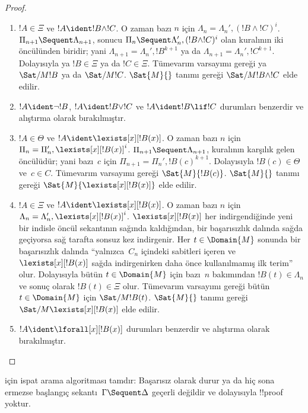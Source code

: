 \begin{proof}
\begin{enumerate}
  \item $!A \in \Xi$ ve $!A \ident !B \land !C$. O zaman bazı $n$ için
  $\Lambda_n = \Lambda_n', (!B \land !C)^i$. $\Pi_{n+1} \Sequent
  \Lambda_{n+1}$, sonucu $\Pi_n \Sequent \Lambda'_n, (!B \land !C)^i$ olan
  \RightR{\land} kuralının iki öncülünden biridir; yani $\Lambda_{n+1} =
  \Lambda_n', !B^{k+1}$ ya da $\Lambda_{n+1} = \Lambda_n', !C^{k+1}$.
  Dolayısıyla ya $!B \in \Xi$ ya da $!C \in \Xi$. Tümevarım varsayımı
  gereği ya $\Sat/{M}{!B}$ ya da $\Sat/{M}{!C}$. $\Sat{M}{}$ tanımı gereği
  $\Sat/{M}{!B \land !C}$ elde edilir.

  \item $!A \ident \lnot !B$, $!A \ident !B \lor !C$ ve $!A \ident !B
  \lif !C$ durumları benzerdir ve alıştırma olarak bırakılmıştır.

  \item $!A \in \Theta$ ve $!A \ident \lexists[x][!B(x)]$. O zaman bazı
  $n$ için $\Pi_n = \Pi_n', \lexists[x][!B(x)]^i$. $\Pi_{n+1} \Sequent
  \Lambda_{n+1}$, \LeftR{\lexists} kuralının karşılık gelen öncülüdür;
  yani bazı~$c$ için $\Pi_{n+1} = \Pi_n', !B(c)^{k+1}$. Dolayısıyla
  $!B(c) \in \Theta$ ve~$c \in C$. Tümevarım varsayımı gereği
  $\Sat{M}{!B(c)}$. $\Sat{M}{}$ tanımı gereği
  $\Sat{M}{\lexists[x][!B(x)]}$ elde edilir.

  \item $!A \in \Xi$ ve $!A \ident \lexists[x][!B(x)]$. O zaman bazı $n$
  için $\Lambda_n = \Lambda_n', \lexists[x][!B(x)]^i$. $\lexists[x][!B(x)]$
  her indirgendiğinde yeni bir indisle öncül sekantının sağında kaldığından,
  bir başarısızlık dalında sağda geçiyorsa sağ tarafta sonsuz kez indirgenir.
  Her $t \in \Domain{M}$ sonunda bir başarısızlık dalında ``yalnızca~$C_n$
  içindeki sabitleri içeren ve $\lexists[x][!B(x)]$ sağda indirgenirken daha
  önce kullanılmamış ilk terim'' olur. Dolayısıyla bütün $t \in \Domain{M}$
  için bazı~$n$ bakımından $!B(t) \in \Lambda_n$ ve sonuç olarak $!B(t) \in
  \Xi$ olur. Tümevarım varsayımı gereği bütün $t \in \Domain{M}$ için
  $\Sat/{M}{!B(t)}$. $\Sat{M}{}$ tanımı gereği
  $\Sat/{M}{\lexists[x][!B(x)]}$ elde edilir.

  \item $!A \ident \lforall[x][!B(x)]$ durumları benzerdir ve alıştırma
  olarak bırakılmıştır.
\end{enumerate}
\end{proof}

\begin{cor}  için ispat arama algoritması
tamdır: Başarısız olarak durur ya da hiç sona ermezse başlangıç
sekantı~$\Gamma \Sequent \Delta$ geçerli değildir ve dolayısıyla !!{proof}
yoktur.
\end{cor}

